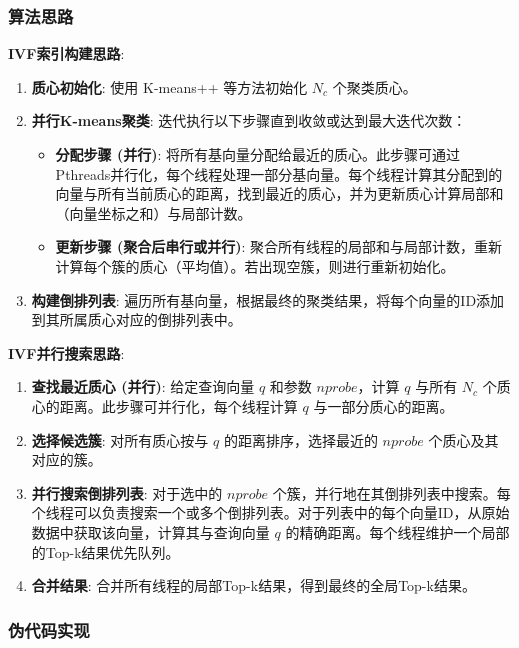 \documentclass[a4paper]{article}
\begin{document}
	\subsubsection{算法思路} %
	\textbf{IVF索引构建思路}:
	\begin{enumerate}
		\item \textbf{质心初始化}: 使用 K-means++ 等方法初始化 $N_c$ 个聚类质心。
		\item \textbf{并行K-means聚类}:
		迭代执行以下步骤直到收敛或达到最大迭代次数：
		\begin{itemize}
			\item \textbf{分配步骤 (并行)}: 将所有基向量分配给最近的质心。此步骤可通过Pthreads并行化，每个线程处理一部分基向量。每个线程计算其分配到的向量与所有当前质心的距离，找到最近的质心，并为更新质心计算局部和（向量坐标之和）与局部计数。
			\item \textbf{更新步骤 (聚合后串行或并行)}: 聚合所有线程的局部和与局部计数，重新计算每个簇的质心（平均值）。若出现空簇，则进行重新初始化。
		\end{itemize}
		\item \textbf{构建倒排列表}: 遍历所有基向量，根据最终的聚类结果，将每个向量的ID添加到其所属质心对应的倒排列表中。
	\end{enumerate}
	\textbf{IVF并行搜索思路}:
	\begin{enumerate}
		\item \textbf{查找最近质心 (并行)}:
		给定查询向量 $q$ 和参数 $nprobe$，计算 $q$ 与所有 $N_c$ 个质心的距离。此步骤可并行化，每个线程计算 $q$ 与一部分质心的距离。
		\item \textbf{选择候选簇}:
		对所有质心按与 $q$ 的距离排序，选择最近的 $nprobe$ 个质心及其对应的簇。
		\item \textbf{并行搜索倒排列表}:
		对于选中的 $nprobe$ 个簇，并行地在其倒排列表中搜索。每个线程可以负责搜索一个或多个倒排列表。对于列表中的每个向量ID，从原始数据中获取该向量，计算其与查询向量 $q$ 的精确距离。每个线程维护一个局部的Top-k结果优先队列。
		\item \textbf{合并结果}:
		合并所有线程的局部Top-k结果，得到最终的全局Top-k结果。
	\end{enumerate}
	
	\subsubsection{伪代码实现} %
	
\end{document}

